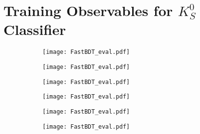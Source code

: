\chapter{Training Observables for $K_S^0$ Classifier}

\begin{figure}[H]
	\caption{The distribution of input variables in signal MC for KsFinder. The red is the from fake $K_S^0$ and the blue is from true $K_S^0$}
\begin{subfigure}{0.5\linewidth}
	\texttt{[image: FastBDT\_eval.pdf]}
\end{subfigure}
\begin{subfigure}{0.5\linewidth}
		\texttt{[image: FastBDT\_eval.pdf]}
\end{subfigure}
\begin{subfigure}{0.5\linewidth}
		\texttt{[image: FastBDT\_eval.pdf]}
\end{subfigure}
\begin{subfigure}{0.5\linewidth}
		\texttt{[image: FastBDT\_eval.pdf]}
\end{subfigure}
\begin{subfigure}{0.5\linewidth}
		\texttt{[image: FastBDT\_eval.pdf]}
\end{subfigure}
\begin{subfigure}{0.5\linewidth}
	\texttt{[image: FastBDT\_eval.pdf]}
\end{subfigure}
\end{figure}

